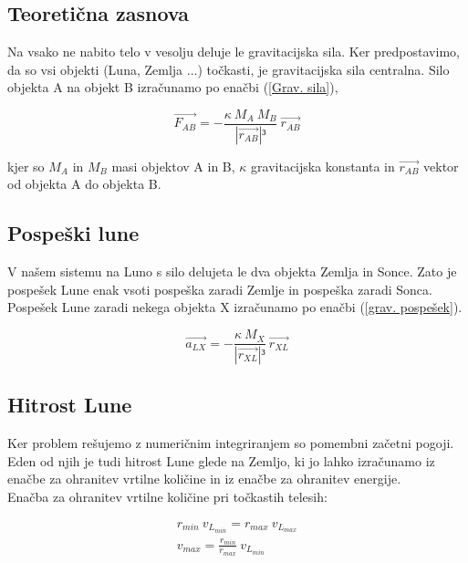 \documentclass[titlepage,12pt,a4paper]{article}
\begin{document}
\subsection{Teoretična zasnova}
Na vsako ne nabito telo v vesolju deluje le gravitacijska sila. Ker predpostavimo, da so vsi objekti (Luna, Zemlja ...) točkasti, je gravitacijska sila centralna. Silo objekta A na objekt B izračunamo po enačbi (\ref{Grav. sila}),

\begin{large}
\begin{equation}
\overrightarrow{F_{AB}} = -\frac{\kappa\ M_A\ M_B}{|\overrightarrow{{r_{AB}}}|³}\ \overrightarrow{{r_{AB}}} \label{Grav. sila}
\end{equation}
\end{large}

kjer so $M_A$ in $M_B$ masi objektov A in B, $\kappa$ gravitacijska konstanta in $\overrightarrow{r_{AB}}$ vektor od objekta A do objekta B.

\subsection{Pospeški lune}
V našem sistemu na Luno s silo delujeta le dva objekta Zemlja in Sonce.
Zato je pospešek Lune enak vsoti pospeška zaradi Zemlje in pospeška zaradi Sonca. Pospešek Lune zaradi nekega objekta X izračunamo po enačbi (\ref{grav. pospešek}).

\begin{large}
\begin{equation}
\overrightarrow{a_{LX}} = -\frac{\kappa\ M_X}{|\overrightarrow{{r_{XL}}}|³}\ \overrightarrow{{r_{XL}}}  \label{grav. pospešek}
\end{equation}
\end{large}


\subsection{Hitrost Lune}
Ker problem rešujemo z numeričnim integriranjem so pomembni začetni pogoji. Eden od njih je tudi hitrost Lune glede na Zemljo, ki jo lahko izračunamo iz enačbe za ohranitev vrtilne količine in iz enačbe za ohranitev energije.
\\

Enačba za ohranitev vrtilne količine pri točkastih telesih:
\begin{large}
\begin{eqnarray}
r_{min}\ v_{L_{min}} =  r_{max}\ v_{L_{max}} \\
v_{max} = \frac{r_{min}}{r_{max}}\ v_{L_{min}} \label{gib. kol. razm.}
\end{eqnarray}
\end{large}
\end{document}
